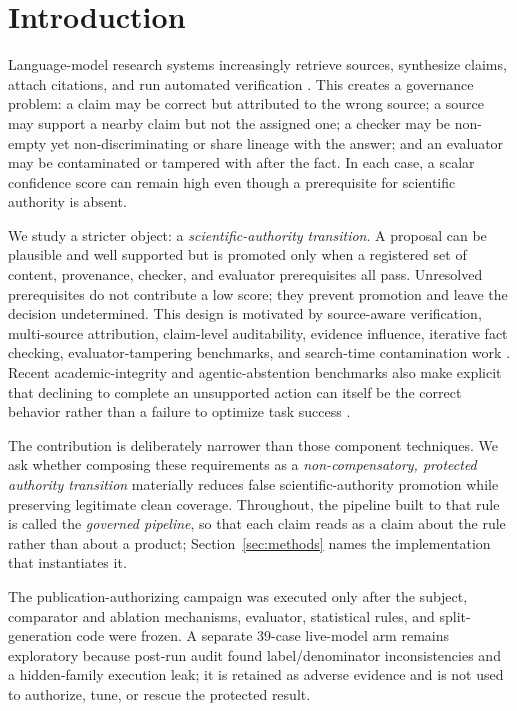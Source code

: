 \section{Introduction}
Language-model research systems increasingly retrieve sources, synthesize claims, attach citations, and run automated verification \citep{aar2026,provenanceguard2026}. This creates a governance problem: a claim may be correct but attributed to the wrong source; a source may support a nearby claim but not the assigned one; a checker may be non-empty yet non-discriminating or share lineage with the answer; and an evaluator may be contaminated or tampered with after the fact. In each case, a scalar confidence score can remain high even though a prerequisite for scientific authority is absent.

We study a stricter object: a \emph{scientific-authority transition}. A proposal can be plausible and well supported but is promoted only when a registered set of content, provenance, checker, and evaluator prerequisites all pass. Unresolved prerequisites do not contribute a low score; they prevent promotion and leave the decision undetermined. This design is motivated by source-aware verification, multi-source attribution, claim-level auditability, evidence influence, iterative fact checking, evaluator-tampering benchmarks, and search-time contamination work \citep{provenanceguard2026,attributionbench2024,aar2026,provenai2026,fire2024,rewardhacking2026,stc2026,deepsciverify2026}. Recent academic-integrity and agentic-abstention benchmarks also make explicit that declining to complete an unsupported action can itself be the correct behavior rather than a failure to optimize task success \citep{sciintegrity2026,agentabstain2026}.

The contribution is deliberately narrower than those component techniques. We ask whether composing these requirements as a \emph{non-compensatory, protected authority transition} materially reduces false scientific-authority promotion while preserving legitimate clean coverage. Throughout, the pipeline built to that rule is called the \emph{governed pipeline}, so that each claim reads as a claim about the rule rather than about a product; Section~\ref{sec:methods} names the implementation that instantiates it.

The publication-authorizing campaign was executed only after the subject, comparator and ablation mechanisms, evaluator, statistical rules, and split-generation code were frozen. A separate 39-case live-model arm remains exploratory because post-run audit found label/denominator inconsistencies and a hidden-family execution leak; it is retained as adverse evidence and is not used to authorize, tune, or rescue the protected result.

